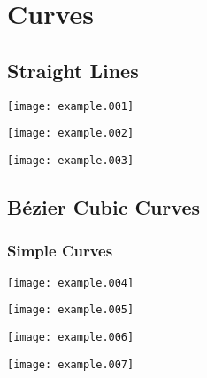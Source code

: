 \documentclass{article}
\newcommand{\figwidth}{0.95\linewidth}
\begin{document}
\section{Curves}

\subsection{Straight Lines}

\begin{minipage}[b]{0.32\linewidth}
\texttt{[image: example.001]}
\end{minipage}
\hfill
\begin{minipage}[b]{0.32\linewidth}
\texttt{[image: example.002]}
\end{minipage}
\hfill
\begin{minipage}[b]{0.32\linewidth}
\centering
\texttt{[image: example.003]}
\end{minipage}

\subsection{B\'ezier Cubic Curves}

\subsubsection{Simple Curves}

\begin{minipage}{\linewidth}
\begin{minipage}{0.38\linewidth}
\texttt{[image: example.004]}
\end{minipage}
\hfill
\begin{minipage}{0.38\linewidth}
\texttt{[image: example.005]}
\end{minipage}

\vspace{2cm}

\begin{minipage}{0.38\linewidth}
\texttt{[image: example.006]}
\end{minipage}
\hfill
\begin{minipage}{0.38\linewidth}
\texttt{[image: example.007]}
\end{minipage}
\end{minipage}
\bigskip
\end{document}
